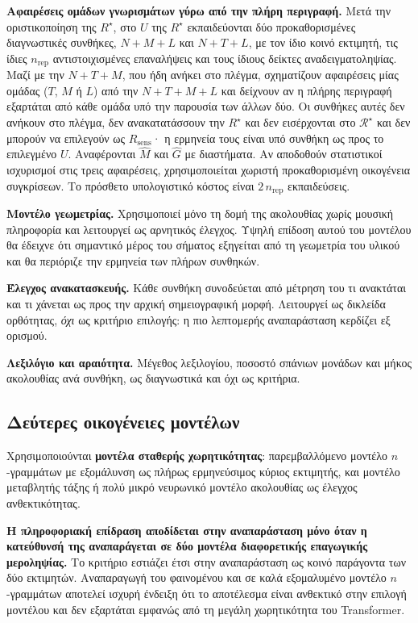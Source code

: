\documentclass[11pt,a4paper]{article}
\begin{document}
\textbf{Αφαιρέσεις ομάδων γνωρισμάτων γύρω από την πλήρη περιγραφή.} Μετά την οριστικοποίηση της \(R^\star\), στο \(U\) της \(R^\star\) εκπαιδεύονται δύο προκαθορισμένες διαγνωστικές συνθήκες, \(N{+}M{+}L\) και \(N{+}T{+}L\), με τον ίδιο κοινό εκτιμητή, τις ίδιες \(n_{\mathrm{rep}}\) αντιστοιχισμένες επαναλήψεις και τους ίδιους δείκτες αναδειγματοληψίας. Μαζί με την \(N{+}T{+}M\), που ήδη ανήκει στο πλέγμα, σχηματίζουν αφαιρέσεις μίας ομάδας (\(T\), \(M\) ή \(L\)) από την \(N{+}T{+}M{+}L\) και δείχνουν αν η πλήρης περιγραφή εξαρτάται από κάθε ομάδα υπό την παρουσία των άλλων δύο. Οι συνθήκες αυτές δεν ανήκουν στο πλέγμα, δεν ανακατατάσσουν την \(R^\star\) και δεν εισέρχονται στο \(\mathcal R^\star\) και δεν μπορούν να επιλεγούν ως \(R_{\mathrm{sens}}\)· η ερμηνεία τους είναι υπό συνθήκη ως προς το επιλεγμένο \(U\). Αναφέρονται \(\widehat M\) και \(\widehat G\) με διαστήματα. Αν αποδοθούν στατιστικοί ισχυρισμοί στις τρεις αφαιρέσεις, χρησιμοποιείται χωριστή προκαθορισμένη οικογένεια συγκρίσεων. Το πρόσθετο υπολογιστικό κόστος είναι \(2\,n_{\mathrm{rep}}\) εκπαιδεύσεις.

\textbf{Μοντέλο γεωμετρίας.} Χρησιμοποιεί μόνο τη δομή της ακολουθίας χωρίς μουσική πληροφορία και λειτουργεί ως αρνητικός έλεγχος. Υψηλή επίδοση αυτού του μοντέλου θα έδειχνε ότι σημαντικό μέρος του σήματος εξηγείται από τη γεωμετρία του υλικού και θα περιόριζε την ερμηνεία των πλήρων συνθηκών.

\textbf{Έλεγχος ανακατασκευής.} Κάθε συνθήκη συνοδεύεται από μέτρηση του τι ανακτάται και τι χάνεται ως προς την αρχική σημειογραφική μορφή. Λειτουργεί ως δικλείδα ορθότητας, \emph{όχι} ως κριτήριο επιλογής: η πιο λεπτομερής αναπαράσταση κερδίζει εξ ορισμού.

\textbf{Λεξιλόγιο και αραιότητα.} Μέγεθος λεξιλογίου, ποσοστό σπάνιων μονάδων και μήκος ακολουθίας ανά συνθήκη, ως διαγνωστικά και όχι ως κριτήρια.

\subsection{Δεύτερες οικογένειες μοντέλων}\label{app:robust-models}

Χρησιμοποιούνται \textbf{μοντέλα σταθερής χωρητικότητας}: παρεμβαλλόμενο μοντέλο \(n\)-γραμμάτων με εξομάλυνση ως πλήρως ερμηνεύσιμος κύριος εκτιμητής, και μοντέλο μεταβλητής τάξης ή πολύ μικρό νευρωνικό μοντέλο ακολουθίας ως έλεγχος ανθεκτικότητας.

\textbf{Η πληροφοριακή επίδραση αποδίδεται στην αναπαράσταση μόνο όταν η κατεύθυνσή της αναπαράγεται σε δύο μοντέλα διαφορετικής επαγωγικής μεροληψίας.} Το κριτήριο εστιάζει έτσι στην αναπαράσταση ως κοινό παράγοντα των δύο εκτιμητών. Αναπαραγωγή του φαινομένου και σε καλά εξομαλυμένο μοντέλο \(n\)-γραμμάτων αποτελεί ισχυρή ένδειξη ότι το αποτέλεσμα είναι ανθεκτικό στην επιλογή μοντέλου και δεν εξαρτάται εμφανώς από τη μεγάλη χωρητικότητα του Transformer.
\end{document}
